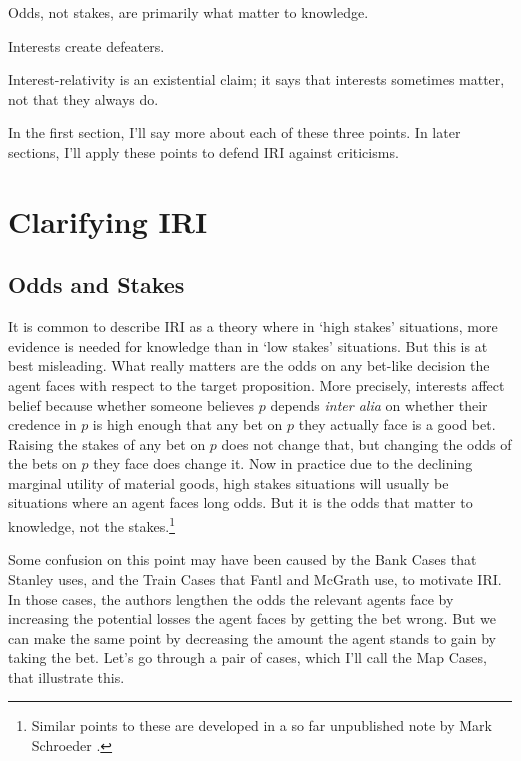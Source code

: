 \documentclass[11pt,oneside]{book}
\begin{document}
\begin{itemize*}
\item Odds, not stakes, are primarily what matter to knowledge.
\item Interests create defeaters.
\item Interest-relativity is an existential claim; it says that interests sometimes matter, not that they always do.
\end{itemize*}

\noindent In the first section, I'll say more about each of these three points. In later sections, I'll apply these points to defend IRI against criticisms.

\section{Clarifying IRI}

\subsection{Odds and Stakes}

It is common to describe IRI as a theory where in `high stakes' situations, more evidence is needed for knowledge than in `low stakes' situations. But this is at best misleading. What really matters are the odds on any bet-like decision the agent faces with respect to the target proposition. More precisely, interests affect belief because  whether someone believes \(p\) depends \textit{inter alia} on whether their credence in \(p\) is high enough that any bet on \(p\) they actually face is a good bet. Raising the stakes of any bet on \(p\) does not change that, but changing the odds of the bets on \(p\) they face does change it. Now in practice due to the declining marginal utility of material goods, high stakes situations will usually be situations where an agent faces long odds. But it is the odds that matter to knowledge, not the stakes.\footnote{Similar points to these are developed in a so far unpublished note by Mark Schroeder \citeyearpar{SchroederStakes}.}

Some confusion on this point may have been caused by the Bank Cases that Stanley uses, and the Train Cases that Fantl and McGrath use, to motivate IRI. In those cases, the authors lengthen the odds the relevant agents face by increasing the potential losses the agent faces by getting the bet wrong. But we can make the same point by decreasing the amount the agent stands to gain by taking the bet. Let's go through a pair of cases, which I'll call the Map Cases, that illustrate this.
\end{document}
